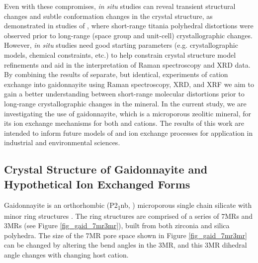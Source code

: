 \documentclass[journal=acsodf,manuscript=article]{achemso}
\begin{document}
Even with these compromises, \textit{in situ} studies can reveal transient structural changes and subtle conformation changes in the crystal structure, as demonstrated in studies of , where short-range titania polyhedral distortions were observed prior to long-range (space group and unit-cell) crystallographic changes. However, \textit{in situ} studies need good starting parameters (e.g. crystallographic models, chemical constraints, etc.) to help constrain crystal structure model refinements and aid in the interpretation of Raman spectroscopy and XRD data. By combining the results of separate, but identical, experiments of cation exchange into gaidonnayite using Raman spectroscopy, XRD, and XRF we aim to gain a better understanding between short-range molecular distortions prior to long-range crystallographic changes in the mineral. In the current study, we are investigating the use of gaidonnayite, which is a microporous zeolitic mineral, for its ion exchange mechanisms for both  and  cations. The results of this work are intended to inform future models of  and  ion exchange processes for application in industrial and environmental sciences.

\subsection{Crystal Structure of Gaidonnayite and Hypothetical Ion Exchanged Forms}

\label{xtl_structures_hypothetical_exchange}  %

Gaidonnayite is an orthorhombic (P2\textsubscript{1}nb, ) microporous single chain silicate with minor ring
structures \cite{Chao1985}. The ring structures are comprised of a
series of 7MRs and 3MRs (see Figure {\ref{fig_gaid_7mr3mr}}),
built from both zirconia and silica polyhedra.   The size of the 7MR
pore space shown in Figure {\ref{fig_gaid_7mr3mr}} can be
changed by altering the bend angles in the 3MR, and this 3MR dihedral
angle changes with changing host cation.
\end{document}
